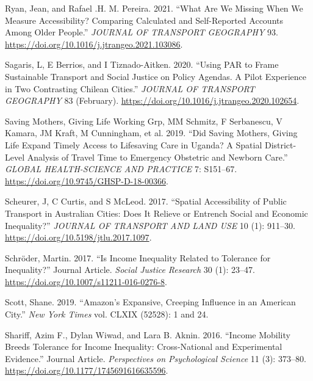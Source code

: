 \documentclass[12pt, oneside]{report}
\newlength{\cslhangindent}
\newlength{\cslentryspacingunit} %
\newenvironment{CSLReferences}[2] %
 {%
  \setlength{\parindent}{0pt}
  \ifodd #1
  \let\oldpar\par
  \def\par{\hangindent=\cslhangindent\oldpar}
  \fi
  \setlength{\parskip}{#2\cslentryspacingunit}
 }%
 {}
\begin{document}
\begin{CSLReferences}{1}{0}
\leavevmode{}%
Ryan, Jean, and Rafael .H. M. Pereira. 2021. {``What Are We Missing When
We Measure Accessibility? {Comparing} Calculated and Self-Reported
Accounts Among Older People.''} \emph{JOURNAL OF TRANSPORT GEOGRAPHY}
93. \url{https://doi.org/10.1016/j.jtrangeo.2021.103086}.

\leavevmode{}%
Sagaris, L, E Berrios, and I Tiznado-Aitken. 2020. {``Using {PAR} to
Frame Sustainable Transport and Social Justice on Policy Agendas. {A}
Pilot Experience in Two Contrasting {Chilean} Cities.''} \emph{JOURNAL
OF TRANSPORT GEOGRAPHY} 83 (February).
\url{https://doi.org/10.1016/j.jtrangeo.2020.102654}.

\leavevmode{}%
Saving Mothers, Giving Life Working Grp, MM Schmitz, F Serbanescu, V
Kamara, JM Kraft, M Cunningham, et al. 2019. {``Did {Saving Mothers},
{Giving Life Expand Timely Access} to {Lifesaving Care} in {Uganda}? {A
Spatial District-Level Analysis} of {Travel Time} to {Emergency
Obstetric} and {Newborn Care}.''} \emph{GLOBAL HEALTH-SCIENCE AND
PRACTICE} 7: S151--67. \url{https://doi.org/10.9745/GHSP-D-18-00366}.

\leavevmode{}%
Scheurer, J, C Curtis, and S McLeod. 2017. {``Spatial Accessibility of
Public Transport in {Australian} Cities: {Does} It Relieve or Entrench
Social and Economic Inequality?''} \emph{JOURNAL OF TRANSPORT AND LAND
USE} 10 (1): 911--30. \url{https://doi.org/10.5198/jtlu.2017.1097}.

\leavevmode{}%
Schröder, Martin. 2017. {``Is Income Inequality Related to Tolerance for
Inequality?''} Journal Article. \emph{Social Justice Research} 30 (1):
23--47. \url{https://doi.org/10.1007/s11211-016-0276-8}.

\leavevmode{}%
Scott, Shane. 2019. {``Amazon's Expansive, Creeping Influence in an
American City.''} \emph{New York Times} vol. CLXIX (52528): 1 and 24.

\leavevmode{}%
Shariff, Azim F., Dylan Wiwad, and Lara B. Aknin. 2016. {``Income
Mobility Breeds Tolerance for Income Inequality: Cross-National and
Experimental Evidence.''} Journal Article. \emph{Perspectives on
Psychological Science} 11 (3): 373--80.
\url{https://doi.org/10.1177/1745691616635596}.


\end{CSLReferences}
\end{document}
